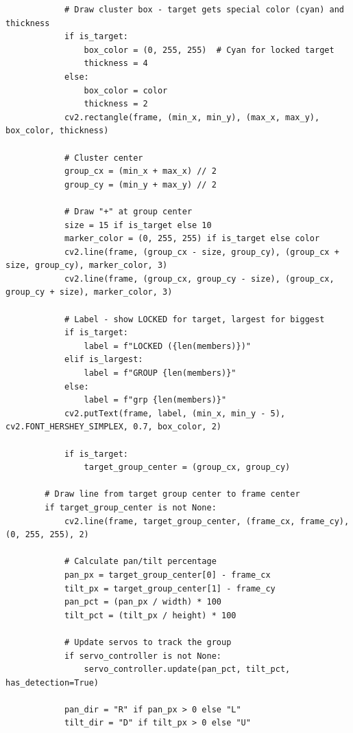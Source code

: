 \documentclass[11pt,a4paper]{article}
\begin{document}
\begin{lstlisting}
            # Draw cluster box - target gets special color (cyan) and thickness
            if is_target:
                box_color = (0, 255, 255)  # Cyan for locked target
                thickness = 4
            else:
                box_color = color
                thickness = 2
            cv2.rectangle(frame, (min_x, min_y), (max_x, max_y), box_color, thickness)
            
            # Cluster center
            group_cx = (min_x + max_x) // 2
            group_cy = (min_y + max_y) // 2
            
            # Draw "+" at group center
            size = 15 if is_target else 10
            marker_color = (0, 255, 255) if is_target else color
            cv2.line(frame, (group_cx - size, group_cy), (group_cx + size, group_cy), marker_color, 3)
            cv2.line(frame, (group_cx, group_cy - size), (group_cx, group_cy + size), marker_color, 3)
            
            # Label - show LOCKED for target, largest for biggest
            if is_target:
                label = f"LOCKED ({len(members)})"
            elif is_largest:
                label = f"GROUP {len(members)}"
            else:
                label = f"grp {len(members)}"
            cv2.putText(frame, label, (min_x, min_y - 5), cv2.FONT_HERSHEY_SIMPLEX, 0.7, box_color, 2)
            
            if is_target:
                target_group_center = (group_cx, group_cy)
        
        # Draw line from target group center to frame center
        if target_group_center is not None:
            cv2.line(frame, target_group_center, (frame_cx, frame_cy), (0, 255, 255), 2)
            
            # Calculate pan/tilt percentage
            pan_px = target_group_center[0] - frame_cx
            tilt_px = target_group_center[1] - frame_cy
            pan_pct = (pan_px / width) * 100
            tilt_pct = (tilt_px / height) * 100
            
            # Update servos to track the group
            if servo_controller is not None:
                servo_controller.update(pan_pct, tilt_pct, has_detection=True)
            
            pan_dir = "R" if pan_px > 0 else "L"
            tilt_dir = "D" if tilt_px > 0 else "U"
            

\end{lstlisting}
\end{document}
